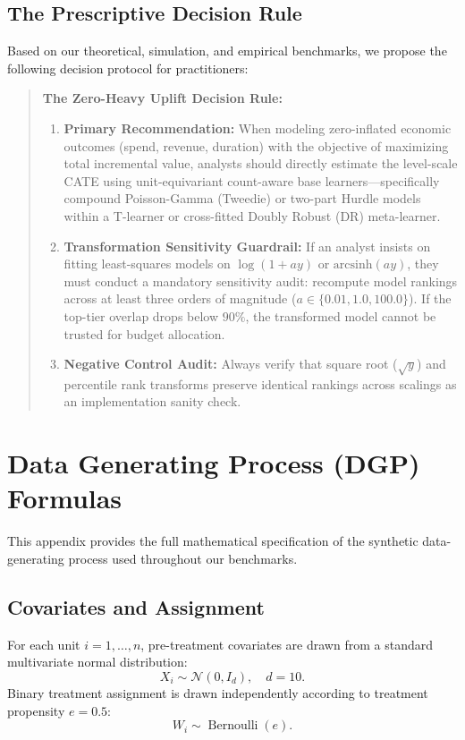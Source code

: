 \documentclass[11pt,a4paper]{article}
\begin{document}
\subsection{The Prescriptive Decision Rule}
Based on our theoretical, simulation, and empirical benchmarks, we propose the following decision protocol for practitioners:
\begin{quote}
\textbf{The Zero-Heavy Uplift Decision Rule:}
\begin{enumerate}
    \item \textbf{Primary Recommendation:} When modeling zero-inflated economic outcomes (spend, revenue, duration) with the objective of maximizing total incremental value, analysts should directly estimate the level-scale CATE using unit-equivariant count-aware base learners---specifically compound Poisson-Gamma (Tweedie) or two-part Hurdle models within a T-learner or cross-fitted Doubly Robust (DR) meta-learner.
    \item \textbf{Transformation Sensitivity Guardrail:} If an analyst insists on fitting least-squares models on $\log(1+ay)$ or $\text{arcsinh}(ay)$, they must conduct a mandatory sensitivity audit: recompute model rankings across at least three orders of magnitude ($a \in \{0.01, 1.0, 100.0\}$). If the top-tier overlap drops below $90\%$, the transformed model cannot be trusted for budget allocation.
    \item \textbf{Negative Control Audit:} Always verify that square root ($\sqrt{y}$) and percentile rank transforms preserve identical rankings across scalings as an implementation sanity check.
\end{enumerate}
\end{quote}




\newpage
\appendix
\section{Data Generating Process (DGP) Formulas}
\label{app:dgp}

This appendix provides the full mathematical specification of the synthetic data-generating process used throughout our benchmarks.

\subsection{Covariates and Assignment}
For each unit $i = 1, \dots, n$, pre-treatment covariates are drawn from a standard multivariate normal distribution:
\begin{equation}
X_i \sim \mathcal{N}(0, I_d), \quad d=10.
\end{equation}
Binary treatment assignment is drawn independently according to treatment propensity $e = 0.5$:
\begin{equation}
W_i \sim \operatorname{Bernoulli}(e).
\end{equation}
\end{document}
